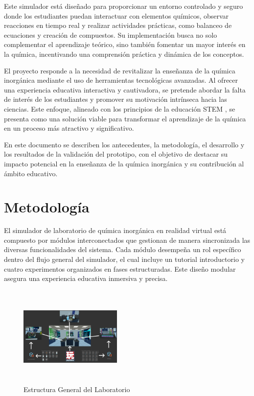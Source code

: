 \documentclass[conference]{IEEEtran}
\begin{document}
Este simulador está diseñado para proporcionar un entorno controlado y seguro donde los estudiantes puedan interactuar con elementos químicos, observar reacciones en tiempo real y realizar actividades prácticas, como balanceo de ecuaciones y creación de compuestos. Su implementación busca no solo complementar el aprendizaje teórico, sino también fomentar un mayor interés en la química, incentivando una comprensión práctica y dinámica de los conceptos.

El proyecto responde a la necesidad de revitalizar la enseñanza de la química inorgánica mediante el uso de herramientas tecnológicas avanzadas. Al ofrecer una experiencia educativa interactiva y cautivadora, se pretende abordar la falta de interés de los estudiantes y promover su motivación intrínseca hacia las ciencias. Este enfoque, alineado con los principios de la educación STEM \cite{Zamorano2018}, se presenta como una solución viable para transformar el aprendizaje de la química en un proceso más atractivo y significativo.

En este documento se describen los antecedentes, la metodología, el desarrollo y los resultados de la validación del prototipo, con el objetivo de destacar su impacto potencial en la enseñanza de la química inorgánica y su contribución al ámbito educativo.

\section{Metodología}

El simulador de laboratorio de química inorgánica en realidad virtual está compuesto por módulos interconectados que gestionan de manera sincronizada las diversas funcionalidades del sistema. Cada módulo desempeña un rol específico dentro del flujo general del simulador, el cual incluye un tutorial introductorio y cuatro experimentos organizados en fases estructuradas. Este diseño modular asegura una experiencia educativa inmersiva y precisa.

\begin{figure}[thbp]
    \centering
    \includegraphics[width=0.45\textwidth, height = 5cm]{img/Lab2.png}
    \caption{Estructura General del Laboratorio}
    \label{fig:Estructura General del Laboratorio}
\end{figure}
\end{document}
